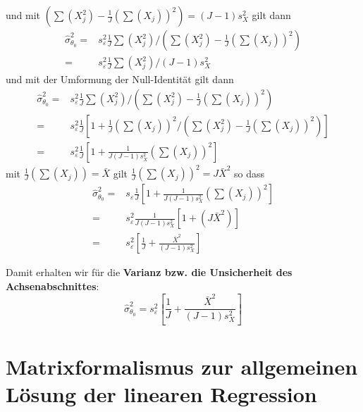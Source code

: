und mit $(\sum(X_j^2) - \frac{1}{J}(\sum(X_j))^2) = (J-1) s_X^2$ gilt dann
\begin{align}
\hat \sigma^2_{\theta_0} =&
s^2_{\varepsilon} \frac{1}{J} \sum(X_j^2)  / (\sum(X_j^2) - \frac{1}{J}(\sum(X_j))^2) \\
=& s^2_{\varepsilon} \frac{1}{J} \sum(X_j^2)  / (J-1) s_X^2
\end{align}
und mit der Umformung der Null-Identität gilt dann
\begin{align}
\hat \sigma^2_{\theta_0}
=& s^2_{\varepsilon} \frac{1}{J} \sum(X_j^2)  / (\sum(X_j^2) - \frac{1}{J}(\sum(X_j))^2) \\
=& s^2_{\varepsilon} \frac{1}{J} \left[ 1 + \frac{1}{J}(\sum(X_j))^2 / (\sum(X_j^2) - \frac{1}{J}(\sum(X_j))^2) \right] \\
=& s^2_{\varepsilon} \frac{1}{J} \left[ 1 + \frac{1}{J(J-1) s_X^2} \left(\sum(X_j)\right)^2 \right]
\end{align}
mit $\frac{1}{J}(\sum(X_j)) = \bar X$ gilt $\frac{1}{J}(\sum(X_j))^2 = J \bar X^2$
so dass
\begin{align}
\hat \sigma^2_{\theta_0} =& s_{\varepsilon} \frac{1}{J} \left[ 1 +
\frac{1}{J (J-1) s_X^2} \left(\sum(X_j) \right)^2 \right] \\
=& s^2_{\varepsilon} \frac{1}{J(J-1) s_X^2} \left[ 1 + (J \bar X^2) \right] \\
=&
s^2_{\varepsilon}  \left[\frac{1}{J} + \frac{\bar X^2}{(J-1) s_X^2} \right]
\end{align}

Damit erhalten wir für die \textbf{Varianz bzw. die Unsicherheit des Achsenabschnittes}:
\begin{equation}
\hat \sigma^2_{\theta_0} =
s^2_{\varepsilon}  \left[ \frac{1}{J} +\frac{\bar {X}^2}{(J - 1) s_X^2 } \right]
\end{equation}

\section{Matrixformalismus zur allgemeinen Lösung der linearen Regression}
